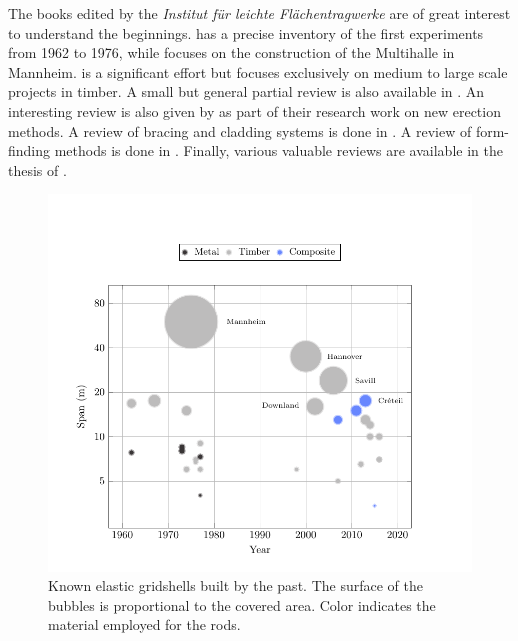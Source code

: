 The books edited by the \emph{Institut für leichte Flächentragwerke} are of great interest to understand the beginnings.  \cite{IL10} has a precise inventory of the first experiments from 1962 to 1976, while  \cite{IL13} focuses on the construction of the Multihalle in Mannheim.  \cite{Chilton2017} is a significant effort but focuses exclusively on medium to large scale projects in timber. A small but general partial review is also available in \cite{Collins2016}. An interesting review is also given by \citet{Quinn2014} as part of their research work on new erection methods. A review of bracing and cladding systems is done in \cite{Cuvilliers2017}. A review of form-finding methods is done in \cite{Vaulot2016}. Finally, various valuable reviews are available in the thesis of \citet{Douthe2007, Bouhaya2010, Tayeb2015a, Lafuente2015}.
\begin{figure}[p]
\begin{fullpage}
	\centering
	\includegraphics[]{ch2_gridshell/plot/1_projects/build.pdf}
	\caption[Known elastic gridshells built by the past.]{Known elastic gridshells built by the past. The surface of the bubbles is proportional to the covered area. Color indicates the material employed for the rods.}
	\label{fig:projectsbymaterial}
\end{fullpage}
\end{figure}

